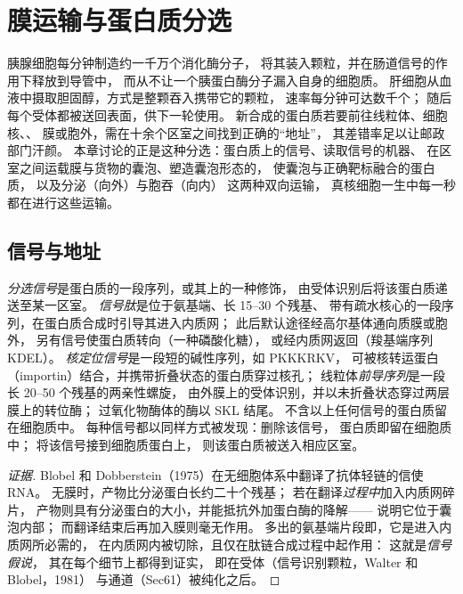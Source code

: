 \chapter{膜运输与蛋白质分选}\label{ch:b3:membrane-traffic}

胰腺细胞每分钟制造约一千万个消化酶分子，
将其装入颗粒，并在肠道信号的作用下释放到导管中，
而从不让一个胰蛋白酶分子漏入自身的细胞质。
肝细胞从血液中摄取胆固醇，方式是整颗吞入携带它的颗粒，
速率每分钟可达数千个；
随后每个受体都被送回表面，供下一轮使用。
新合成的蛋白质若要前往线粒体、细胞核、、
膜或胞外，需在十余个区室之间找到正确的“地址”，
其差错率足以让邮政部门汗颜。
本章讨论的正是这种分选：蛋白质上的信号、读取信号的机器、
在区室之间运载膜与货物的囊泡、塑造囊泡形态的，
使囊泡与正确靶标融合的蛋白质，
以及分泌（向外）与胞吞（向内）
这两种双向运输，
真核细胞一生中每一秒都在进行这些运输。

\section{信号与地址}

\begin{definition}[分选信号]\label{def:b3:membrane-traffic:signals}
\emph{分选信号}是蛋白质的一段序列，或其上的一种修饰，
由受体识别后将该蛋白质递送至某一区室。
\emph{信号肽}是位于氨基端、长 \numrange{15}{30} 个残基、
带有疏水核心的一段序列，在蛋白质合成时引导其进入内质网；
此后默认途径经高尔基体通向质膜或胞外，
另有信号使蛋白质转向（一种磷酸化糖），
或经内质网返回（羧基端序列 KDEL）。
\emph{核定位信号}是一段短的碱性序列，如 PKKKRKV，
可被核转运蛋白（importin）结合，并携带折叠状态的蛋白质穿过核孔；
线粒体\emph{前导序列}是一段长 \numrange{20}{50} 个残基的两亲性螺旋，
由外膜上的受体识别，并以未折叠状态穿过两层膜上的转位酶；
过氧化物酶体的酶以 SKL 结尾。
不含以上任何信号的蛋白质留在细胞质中。
每种信号都以同样方式被发现：删除该信号，
蛋白质即留在细胞质中；
将该信号接到细胞质蛋白上，
则该蛋白质被送入相应区室。
\end{definition}

\begin{proof}[证据]
Blobel 和 Dobberstein（1975）在无细胞体系中翻译了抗体轻链的信使 RNA。
无膜时，产物比分泌蛋白长约二十个残基；
若在翻译\emph{过程中}加入内质网碎片，
产物则具有分泌蛋白的大小，并能抵抗外加蛋白酶的降解——
说明它位于囊泡内部；
而翻译结束后再加入膜则毫无作用。
多出的氨基端片段即，它是进入内质网所必需的，
在内质网内被切除，且仅在肽链合成过程中起作用：
这就是\emph{信号假说}，
其在每个细节上都得到证实，
即在受体（信号识别颗粒，Walter 和 Blobel，1981）
与通道（Sec61）被纯化之后。
\end{proof}

